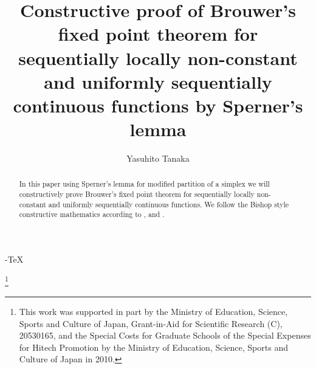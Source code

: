 \documentclass[reqno]{amsart}
\begin{document}
\AmS -\TeX
\title[Constructive proof of Brouwer's fixed point theorem]{Constructive proof of Brouwer's fixed point theorem for sequentially locally non-constant and uniformly sequentially continuous functions by Sperner's lemma}

\author{Yasuhito Tanaka}
\thanks{This work was supported in part by the Ministry of Education, Science, Sports and Culture of Japan, Grant-in-Aid for Scientific Research (C), 20530165, and the Special Costs for Graduate Schools of the Special Expenses for Hitech Promotion by the Ministry of Education, Science, Sports and Culture of Japan in 2010.}\address{Faculty of Economics, Doshisha University, Kamigyo-ku, Kyoto, 602-8580, Japan}


\begin{abstract}
In this paper using Sperner's lemma for modified partition of a simplex we will constructively prove Brouwer's fixed point theorem for sequentially locally non-constant and uniformly sequentially continuous functions. We follow the Bishop style constructive mathematics according to \cite{bb}, \cite{br} and \cite{bv}.
\end{abstract}


\maketitle
\end{document}
